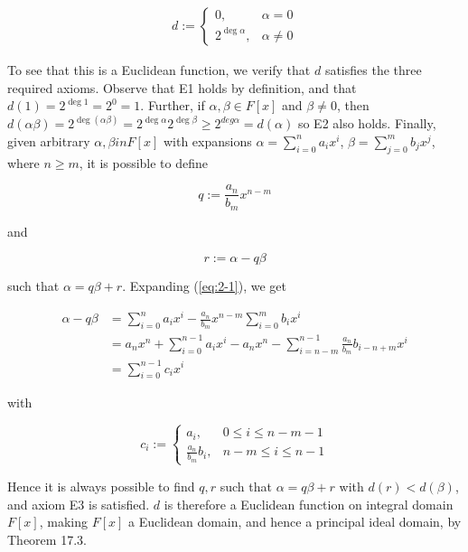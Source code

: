 \documentclass{article}
\begin{document}
\begin{align*}
    d := \begin{cases}
        0, & \alpha = 0\\
        2^{\deg{\alpha}}, & \alpha \neq 0
    \end{cases}
\end{align*}

To see that this is a Euclidean function, we verify that $d$ satisfies
the three required axioms. Observe that E1 holds by definition, and that
$d(1) = 2^{\deg 1} = 2^0 = 1$. Further, if $\alpha, \beta \in F[x]$ and
$\beta \neq 0$, then
$d(\alpha\beta) = 2^{\deg(\alpha\beta)}
    = 2^{\deg\alpha}2^{\deg\beta}
    \geq 2^{deg\alpha} = d(\alpha)$
so E2 also holds. Finally, given arbitrary $\alpha, \beta in F[x]$ with
expansions $\alpha = \sum_{i = 0}^n a_ix^i$, $\beta = \sum_{j = 0}^m b_jx^j$,
where $n \geq m$, it is possible to define

\begin{equation*}
    q := \frac{a_n}{b_m}x^{n - m}
\end{equation*}

and

\begin{equation} \label{eq:2-1}
    r := \alpha - q\beta
\end{equation}

such that $\alpha = q\beta + r$. Expanding (\ref{eq:2-1}), we get

\begin{align*}
    \alpha - q\beta &= \sum_{i = 0}^n a_ix^i - \frac{a_n}{b_m}x^{n - m}\sum_{i = 0}^m b_ix^i\\
    &= a_nx^n + \sum_{i = 0}^{n - 1}a_ix^i - a_nx^{n} - \sum_{i = n - m}^{n - 1}
        \frac{a_n}{b_m}b_{i - n + m}x^i\\
    &= \sum_{i = 0}^{n - 1}c_ix^i
\end{align*}

with

\begin{equation*}
    c_i := \begin{cases}
        a_i, & 0 \leq i \leq n - m - 1\\
        \frac{a_n}{b_m}b_i, & n - m \leq i \leq n - 1
    \end{cases}
\end{equation*}

Hence it is always possible to find $q, r$ such that $\alpha = q\beta + r$ with
$d(r) < d(\beta)$, and axiom E3 is satisfied. $d$ is therefore a Euclidean function on
integral domain $F[x]$, making $F[x]$ a Euclidean domain, and hence a principal
ideal domain, by Theorem 17.3.
\end{document}
